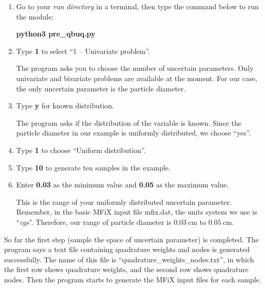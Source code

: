 \documentclass[a4paper,12pt,titlepage]{article}
\newcommand{\MFIX}{MFiX }
\begin{document}
\begin{enumerate}[leftmargin=0cm,itemindent=0.5cm]
 \item Go to your \emph{run directory} in a terminal, then type the command 
  below to run the module:
  
  \textbf{python3 pre\_qbuq.py}
  
 \item Type \textbf{1} to select ``1 -- Univariate problem''.
 
 The program asks you to choose the number of uncertain parameters. Only
 univariate and bivariate problems are available at the moment. For our case,
 the only uncertain parameter is the particle diameter.
 
 \item Type \textbf{y} for known distribution.
 
 The program asks if the distribution of the variable is known. Since the 
 particle diameter in our example is uniformly distributed, we choose ``yes''.
 
 \item Type \textbf{1} to choose ``Uniform distribution''.
 
 \item Type \textbf{10} to generate ten samples in the example.
 
 \item Enter \textbf{0.03} as the minimum value and \textbf{0.05} as the maximum
 value.
 
 This is the range of your uniformly distributed uncertain parameter. Remember, 
 in the basic \MFIX input file mfix.dat, the units system we use is 
 ``\emph{cgs}''. Therefore, our range of particle diameter is 
 $0.03\ \textrm{cm}$ to $0.05\ \textrm{cm}$.
\end{enumerate}

So far the first step (sample the space of uncertain parameter) is completed.
The program says a text file containing quadrature weights and nodes is
generated successfully. The name of this file is
``quadrature\_weights\_nodes.txt'', in which the first row shows quadrature
weights, and the second row shows quadrature nodes. Then the program starts to
generate the \MFIX input files for each sample.
\end{document}
